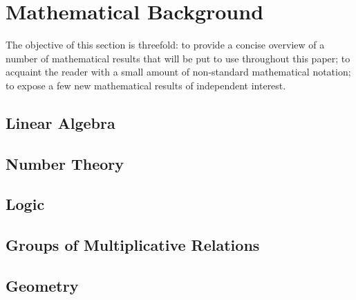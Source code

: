 \section{Mathematical Background}
The objective of this section is threefold: to provide a concise overview of a number of mathematical results that will be put to use throughout this paper; to acquaint the reader with a small amount of non-standard mathematical notation; to expose a few new mathematical results of independent interest.
\label{ch:background}
\subsection{Linear Algebra}



\subsection{Number Theory}



\subsection{Logic}


\subsection{Groups of Multiplicative Relations}

\subsection{Geometry}




